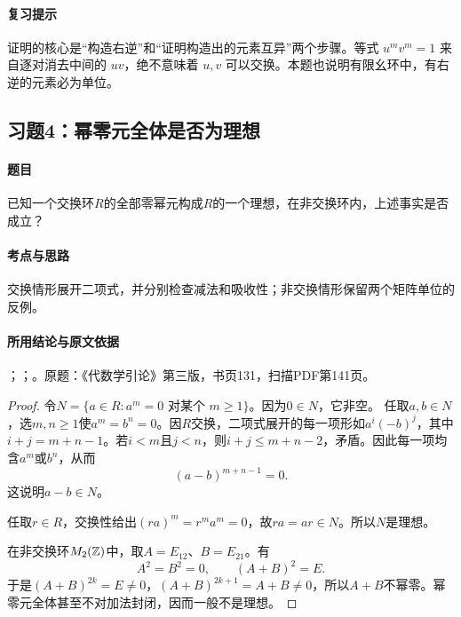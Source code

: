\paragraph{复习提示}

证明的核心是“构造右逆”和“证明构造出的元素互异”两个步骤。等式 $u^mv^m=1$ 来自逐对消去中间的 $uv$，绝不意味着 $u,v$ 可以交换。本题也说明有限幺环中，有右逆的元素必为单位。



\subsection{习题4：幂零元全体是否为理想}

\label{ex:3:4}

\paragraph{题目}

已知一个交换环$R$的全部零幂元构成$R$的一个理想，在非交换环内，上述事实是否成立？

\paragraph{考点与思路}

交换情形展开二项式，并分别检查减法和吸收性；非交换情形保留两个矩阵单位的反例。

\paragraph{所用结论与原文依据}

；；。原题：《代数学引论》第三版，书页131，扫描PDF第141页。


\begin{proof}

令$N=\{a\in R:a^m=0\text{ 对某个 }m\ge1\}$。因为$0\in N$，它非空。
任取$a,b\in N$，选$m,n\ge1$使$a^m=b^n=0$。因$R$交换，二项式展开的每一项形如$a^i(-b)^j$，其中$i+j=m+n-1$。若$i<m$且$j<n$，则$i+j\le m+n-2$，矛盾。因此每一项均含$a^m$或$b^n$，从而
\[
(a-b)^{m+n-1}=0.
\]
这说明$a-b\in N$。

任取$r\in R$，交换性给出$(ra)^m=r^ma^m=0$，故$ra=ar\in N$。所以$N$是理想。

在非交换环$M_2(\mathbb Z)$中，取$A=E_{12}$、$B=E_{21}$。有
\[
A^2=B^2=0,\qquad (A+B)^2=E.
\]
于是$(A+B)^{2k}=E\ne0$，$(A+B)^{2k+1}=A+B\ne0$，所以$A+B$不幂零。幂零元全体甚至不对加法封闭，因而一般不是理想。

\end{proof}

